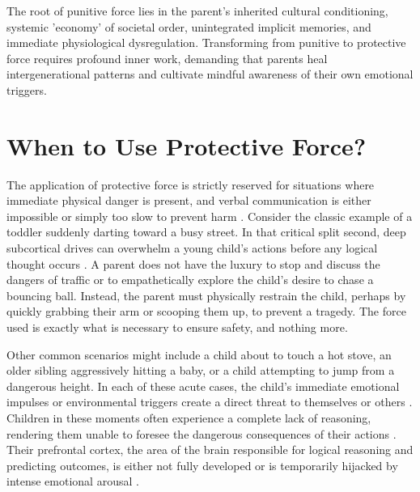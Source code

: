 \begin{keyinsight}
The root of punitive force lies in the parent's inherited cultural conditioning, systemic 'economy' of societal order, unintegrated implicit memories, and immediate physiological dysregulation.
Transforming from punitive to protective force requires profound inner work, demanding that parents heal intergenerational patterns and cultivate mindful awareness of their own emotional triggers.
\end{keyinsight}


\section{When to Use Protective Force?}

The application of protective force is strictly reserved for situations where immediate physical danger is present, and verbal communication is either impossible or simply too slow to prevent harm \citep{rosenberg2003}.
Consider the classic example of a toddler suddenly darting toward a busy street.
In that critical split second, deep subcortical drives can overwhelm a young child's actions before any logical thought occurs \citep{panksepp1998}.
A parent does not have the luxury to stop and discuss the dangers of traffic or to empathetically explore the child's desire to chase a bouncing ball.
Instead, the parent must physically restrain the child, perhaps by quickly grabbing their arm or scooping them up, to prevent a tragedy.
The force used is exactly what is necessary to ensure safety, and nothing more.

Other common scenarios might include a child about to touch a hot stove, an older sibling aggressively hitting a baby, or a child attempting to jump from a dangerous height.
In each of these acute cases, the child's immediate emotional impulses or environmental triggers create a direct threat to themselves or others \citep{lobue2022}.
Children in these moments often experience a complete lack of reasoning, rendering them unable to foresee the dangerous consequences of their actions \citep{ruba2020}.
Their prefrontal cortex, the area of the brain responsible for logical reasoning and predicting outcomes, is either not fully developed or is temporarily hijacked by intense emotional arousal \citep{gottman1997}.

